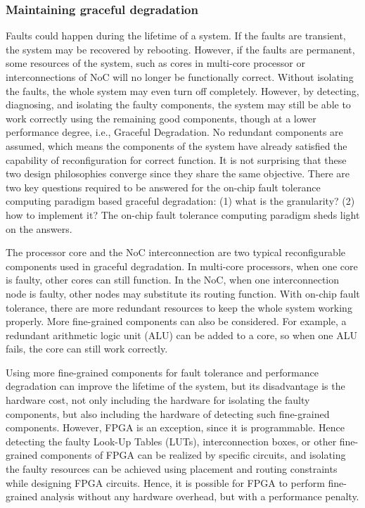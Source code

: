 \subsubsection{Maintaining graceful degradation}
Faults could happen during the lifetime of a system. If the faults are transient, the system may be recovered by rebooting. However, if the faults are permanent, some resources of the system, such as cores in multi-core processor or interconnections of NoC will no longer be functionally correct. Without isolating the faults, the whole system may even turn off completely. However, by detecting, diagnosing, and isolating the faulty components, the system may still be able to work correctly using the remaining good components, though at a lower performance degree, i.e., Graceful Degradation. No redundant components are assumed, which means the components of the system have already satisfied the capability of reconfiguration for correct function. It is not surprising that these two design philosophies converge since they share the same objective. There are two key questions required to be answered for the on-chip fault tolerance computing paradigm based graceful degradation: (1) what is the granularity? (2) how to implement it? The on-chip fault tolerance computing paradigm sheds light on the answers.

The processor core and the NoC interconnection are two typical reconfigurable components used in graceful degradation. In multi-core processors, when one core is faulty, other cores can still function. In the NoC, when one interconnection node is faulty, other nodes may substitute its routing function. With on-chip fault tolerance, there are more redundant resources to keep the whole system working properly. More fine-grained components can also be considered. For example, a redundant arithmetic logic unit (ALU) can be added to a core, so when one ALU fails, the core can still work correctly.

Using more fine-grained components for fault tolerance and performance degradation can improve the lifetime of the system, but its disadvantage is the hardware cost, not only including the hardware for isolating the faulty components, but also including the hardware of detecting such fine-grained components. However, FPGA is an exception, since it is programmable. Hence detecting the faulty Look-Up Tables (LUTs), interconnection boxes, or other fine-grained components of FPGA can be realized by specific circuits, and isolating the faulty resources can be achieved using placement and routing constraints while designing FPGA circuits. Hence, it is possible for FPGA to perform fine-grained analysis without any hardware overhead, but with a performance penalty.

